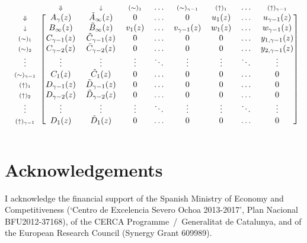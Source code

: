 \documentclass{article}
\newcommand{\DN}{\scriptstyle{\Downarrow}}
\newcommand{\dn}{\scriptstyle{\downarrow}}
\newcommand{\up}[1]{\scriptstyle{(\uparrow)_{#1}}}
\newcommand{\eq}[1]{\scriptstyle{(\sim)_{#1}}}
\begin{document}
\begin{equation*}
\begin{blockarray}{ccccccccc}
   & \DN & \dn &\eq{1} & \ldots & \eq{\gamma-1} &
    \up{1} & \ldots & \up{\gamma-1} \\
\begin{block}{c[cccccccc]}
\DN & A_\gamma(z) & \tilde{A}_\infty(z) & 0 & \ldots & 0 & u_1(z)
    & \ldots & u_{\gamma-1}(z) \\
\dn & B_\infty(z) & \tilde{B}_\infty(z) & v_1(z) & \ldots &
    v_{\gamma-1}(z) & w_1(z) & \ldots & w_{\gamma-1}(z) \\
\eq{1} & C_{\gamma-1}(z) & \tilde{C}_{\gamma-1}(z) & 0 & \ldots & 0 & 0 &
    \ldots & y_{1,\gamma-1}(z) \\
\eq{2} & C_{\gamma-2}(z) & \tilde{C}_{\gamma-2}(z) & 0 & \ldots & 0 & 0 &
    \ldots & y_{2,\gamma-1}(z) \\
\vdots & \vdots & \vdots & \vdots & \ddots & \vdots & \vdots &
    \ddots & \vdots \\
\eq{\gamma-1} & C_1(z) & \tilde{C}_1(z) & 0 & 
    \ldots & 0 & 0 & \ldots & 0 \\
\up{1} & D_{\gamma-1}(z) & \tilde{D}_{\gamma-1}(z) & 0 & \ldots & 0 & 0 &
    \ldots & 0 \\
\up{2} & D_{\gamma-2}(z) & \tilde{D}_{\gamma-2}(z) & 0 & \ldots & 0 & 0 &
    \ldots & 0  \\
\vdots & \vdots & \vdots & \vdots & \ddots & \vdots & \vdots &
    \ddots & \vdots \\
\up{\gamma-1} & D_1(z) & \tilde{D}_1(z) & 0 & \ldots & 0 & 0 &
    \ldots & 0 \\
\end{block}
\end{blockarray}
\end{equation*}


\section*{Acknowledgements}

I acknowledge the financial support of the Spanish Ministry of Economy and
Competitiveness (‘Centro de Excelencia Severo Ochoa 2013-2017’, Plan
Nacional BFU2012-37168), of the CERCA Programme~/~Generalitat de
Catalunya, and of the European Research Council (Synergy Grant 609989).






\end{document}
